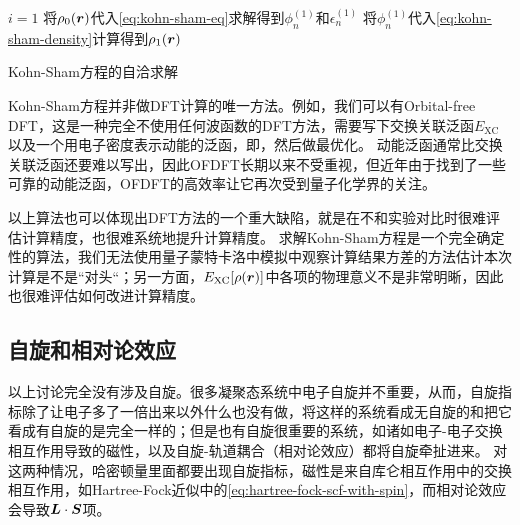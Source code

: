 \begin{algorithm}

    \DontPrintSemicolon
    \SetAlgoLined

    
    $i = 1$ \;
    将$\rho_0(\vb*{r})$代入\eqref{eq:kohn-sham-eq}求解得到$\phi_n^{(1)}$和$\epsilon_n^{(1)}$ \;
    将$\phi_n^{(1)}$代入\eqref{eq:kohn-sham-density}计算得到$\rho_1(\vb*{r})$ \;
    
    \;

    \caption{Kohn-Sham方程的自洽求解}
    \label{alg:basic-kohn-sham}
\end{algorithm}


Kohn-Sham方程并非做DFT计算的唯一方法。例如，我们可以有Orbital-free DFT，这是一种完全不使用任何波函数的DFT方法，需要写下交换关联泛函$E_\text{XC}$以及一个用电子密度表示动能的泛函，即，然后做最优化。
动能泛函通常比交换关联泛函还要难以写出，因此OFDFT长期以来不受重视，但近年由于找到了一些可靠的动能泛函，OFDFT的高效率让它再次受到量子化学界的关注。

以上算法也可以体现出DFT方法的一个重大缺陷，就是在不和实验对比时很难评估计算精度，也很难系统地提升计算精度。
求解Kohn-Sham方程是一个完全确定性的算法，我们无法使用量子蒙特卡洛中模拟中观察计算结果方差的方法估计本次计算是不是“对头“；另一方面，$E_\text{XC}[\rho(\vb*{r})]$中各项的物理意义不是非常明晰，因此也很难评估如何改进计算精度。

\subsection{自旋和相对论效应}

以上讨论完全没有涉及自旋。很多凝聚态系统中电子自旋并不重要，从而，自旋指标除了让电子多了一倍出来以外什么也没有做，将这样的系统看成无自旋的和把它看成有自旋的是完全一样的；但是也有自旋很重要的系统，如诸如电子-电子交换相互作用导致的磁性，以及自旋-轨道耦合（相对论效应）都将自旋牵扯进来。
对这两种情况，哈密顿量里面都要出现自旋指标，磁性是来自库仑相互作用中的交换相互作用，如Hartree-Fock近似中的\eqref{eq:hartree-fock-scf-with-spin}，而相对论效应会导致$\vb*{L} \cdot \vb*{S}$项。


